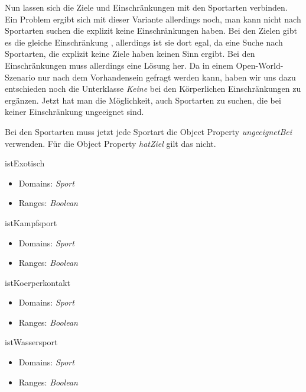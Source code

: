 Nun lassen sich die Ziele und Einschr\"ankungen mit den Sportarten verbinden. Ein Problem ergibt sich mit dieser Variante allerdings noch, man kann nicht nach Sportarten suchen die explizit keine Einschr\"ankungen haben. Bei den Zielen gibt es die gleiche Einschr\"ankung , allerdings ist sie dort egal, da eine Suche nach Sportarten, die explizit keine Ziele haben keinen Sinn ergibt. Bei den Einschr\"ankungen muss allerdings eine L\"osung her. Da in einem Open-World-Szenario nur nach dem Vorhandensein gefragt werden kann, haben wir uns dazu entschieden noch die Unterklasse \textit{Keine} bei den K\"orperlichen Einschr\"ankungen zu erg\"anzen. Jetzt hat man die M\"oglichkeit, auch Sportarten zu suchen, die bei keiner Einschr\"ankung ungeeignet sind.

Bei den Sportarten muss jetzt jede Sportart die Object Property \textit{ungeeignetBei} verwenden.   F\"ur die Object Property \textit{hatZiel} gilt das nicht. 

\begin{capitemize}
	\item istExotisch
		\begin{itemize}
			\item Domains: \textit{Sport}
			\item Ranges: \textit{Boolean}
		\end{itemize}
	\item istKampfsport
		\begin{itemize}
			\item Domains: \textit{Sport}
			\item Ranges: \textit{Boolean}
		\end{itemize}
	\item istKoerperkontakt
		\begin{itemize}
			\item Domains: \textit{Sport}
			\item Ranges: \textit{Boolean}
		\end{itemize}
	\item istWassersport
		\begin{itemize}
			\item Domains: \textit{Sport}
			\item Ranges: \textit{Boolean}
		\end{itemize}
\end{capitemize}

